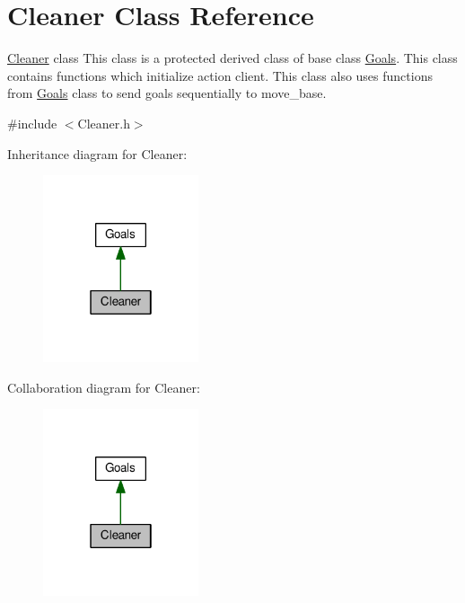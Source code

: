\hypertarget{classCleaner}{}\section{Cleaner Class Reference}
\label{classCleaner}


\hyperlink{classCleaner}{Cleaner} class This class is a protected derived class of base class \hyperlink{classGoals}{Goals}. This class contains functions which initialize action client. This class also uses functions from \hyperlink{classGoals}{Goals} class to send goals sequentially to move\+\_\+base.  




{\ttfamily \#include $<$Cleaner.\+h$>$}



Inheritance diagram for Cleaner\+:\nopagebreak
\begin{figure}[H]
\begin{center}
\leavevmode
\includegraphics[width=130pt]{classCleaner__inherit__graph}
\end{center}
\end{figure}


Collaboration diagram for Cleaner\+:\nopagebreak
\begin{figure}[H]
\begin{center}
\leavevmode
\includegraphics[width=130pt]{classCleaner__coll__graph}
\end{center}
\end{figure}
